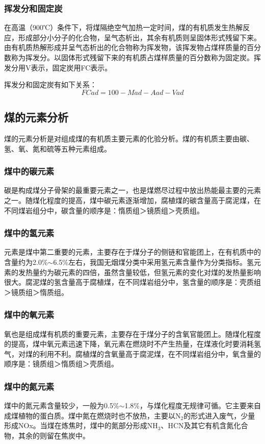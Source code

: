 \documentclass[10pt,openany]{ctexbook}
\begin{document}
\subsubsection{挥发分和固定炭} 在高温（900℃）条件下，将煤隔绝空气加热一定时间，煤的有机质发生热解反应，形成部分小分子的化合物，呈气态析出，其余有机质则呈固体形式残留下来。由有机质热解形成并呈气态析出的化合物称为挥发物，该挥发物占煤样质量的百分数称为挥发分。以固体形式残留下来的有机质占煤样质量的百分数称为固定炭。挥发分用V表示，固定炭用FC表示。\par
挥发分和固定炭有如下关系：$$FCad=100-Mad-Aad-Vad$$
\subsection{煤的元素分析} 煤的元素分析是对组成煤的有机质主要元素的化验分析。煤的有机质主要由碳、氢、氧、氮和硫等五种元素组成。
\subsubsection{煤中的碳元素} 碳是构成煤分子骨架的最重要元素之一，也是煤燃尽过程中放出热能最主要的元素之一。随煤化程度的提高，煤中碳元素逐渐增加，腐植煤的碳含量高于腐泥煤，在不同煤岩组分中，碳含量的顺序是：惰质组＞镜质组＞壳质组。
\subsubsection{煤中的氢元素} 元素是煤中第二重要的元素，主要存在于煤分子的侧链和官能团上，在有机质中的含量约为2.0\%$\sim$6.5\%左右，我国无烟煤分类中采用氢元素含量作为分类指标。氢元素的发热量约为碳元素的四倍，虽然含量较低，但氢元素的变化对煤的发热量影响很大。腐泥煤的氢含量高于腐植煤，在不同煤岩组分中，氢含量的顺序是：壳质组＞镜质组＞惰质组。
\subsubsection{煤中的氧元素} 氧也是组成煤有机质的重要元素，主要存在于煤分子的含氧官能团上。随煤化程度的提高，煤中氧元素迅速下降，氧元素在燃烧时不产生热量，在煤液化时要消耗氢气，对煤的利用不利。腐植煤的含氧量高于腐泥煤，在不同煤岩组分中，氧含量的顺序是：镜质组＞惰质组＞壳质组。
\subsubsection{煤中的氮元素} 煤中的氮元素含量较少，一般为0.5\%$\sim$1.8\%，与煤化程度无规律可循。它主要来自成煤植物的蛋白质。煤中氮在燃烧时也不放热，主要以N$_2$的形式进入废气，少量形成NOx。当煤在炼焦时，煤中的氮部分形成NH$_3$、HCN及其它有机含氮化合物，其余的则留在焦炭中。
\end{document}
